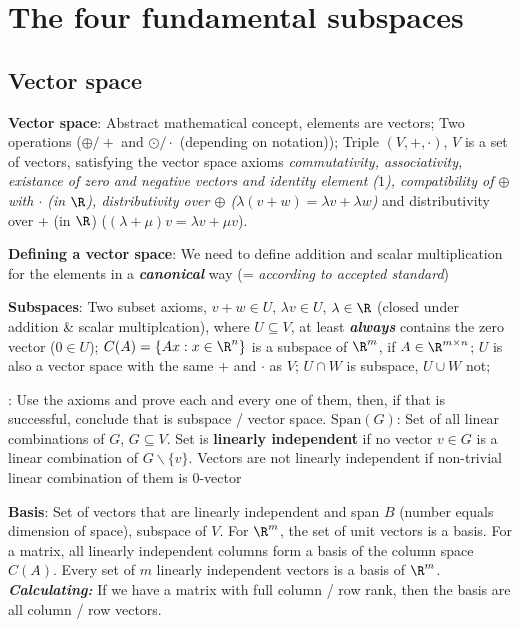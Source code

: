 \newsection
\section{The four fundamental subspaces}
\vspace{-0.2pc}
\subsection{Vector space}
\vspace{-0.5pc}
\shortdef \textbf{Vector space}: Abstract mathematical concept, elements are vectors; Two operations ($\oplus / +$ and $\odot / \cdot$ (depending on notation)); Triple $(V, +, \cdot)$, $V$ is a set of vectors, satisfying the vector space axioms \textit{commutativity, associativity, existance of zero and negative vectors and identity element ($1$), compatibility of $\oplus$ with $\cdot$ (in $\R$), distributivity over $\oplus$ ($\lambda(v + w) = \lambda v + \lambda w$)} and distributivity over + (in $\R$) ($(\lambda + \mu)v = \lambda v + \mu v$).

\textbf{Defining a vector space}: We need to define addition and scalar multiplication for the elements in a \textbf{\textit{canonical}} way (= \textit{according to accepted standard})

\setcounter{all}{8}\shortdef \textbf{Subspaces}: Two subset axioms, $v + w \in U$, $\lambda v \in U$, 
$\lambda \in \R$ (closed under addition \& scalar multiplcation), where $U \subseteq V$, \shortlemma at least \textbf{\textit{always}} contains the zero vector ($0 \in U$);
$C(A) = \{Ax : x \in \R^n\}$ is a subspace of $\R^m$, if $A \in \R^{m \times n}$;
\setcounter{all}{12} \shortlemma $U$ is also a vector space with the same $+$ and $\cdot$ as $V$;
$U \cap W$ is subspace, $U \cup W$ not;

: Use the axioms and prove each and every one of them, then, if that is successful, conclude that is subspace / vector space.
\setcounter{all}{15}\shortdef \textbf{$\text{Span}(G)$}: Set of all linear combinations of $G$, $G \subseteq V$. Set is \textbf{linearly independent} if no vector $v \in G$ is a linear combination of $G\backslash \{v\}$. Vectors are not linearly independent if non-trivial linear combination of them is $0$-vector

\shortdef \textbf{Basis}: Set of vectors that are linearly independent and span $B$ (number equals dimension of space), subspace of $V$. For $\R^m$, the set of unit vectors is a basis. For a matrix, all linearly independent columns form a basis of the column space $C(A)$. Every set of $m$ linearly independent vectors is a basis of $\R^m$. \textbf{\textit{Calculating:}} If we have a matrix with full column / row rank, then the basis are all column / row vectors.

